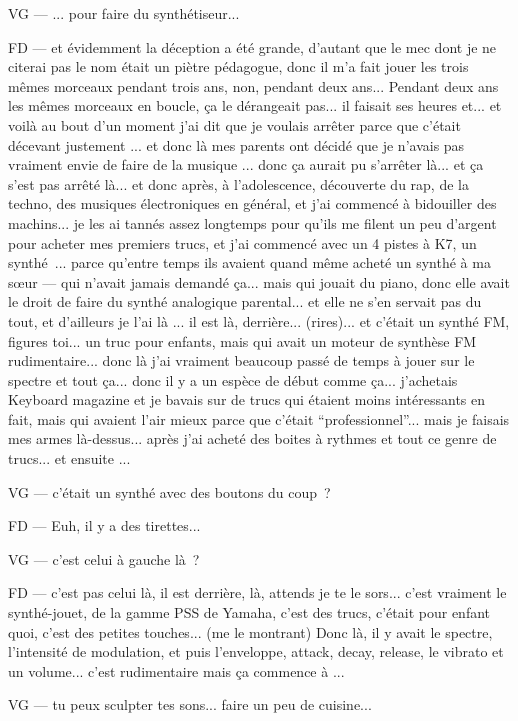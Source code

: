 VG — ... pour faire du synthétiseur... 

FD — et évidemment la déception a été grande, d'autant que le mec dont je ne citerai pas le nom était un piètre pédagogue, donc il m'a fait jouer les trois mêmes morceaux pendant trois ans, non, pendant deux ans... Pendant deux ans les mêmes morceaux en boucle, ça le dérangeait pas... il faisait ses heures et... et voilà au bout d'un moment j'ai dit que je voulais arrêter parce que c'était décevant justement ... et donc là mes parents ont décidé que je n'avais pas vraiment envie de faire de la musique ... donc ça aurait pu s'arrêter là... et ça s'est pas arrêté là... et donc après, à l'adolescence, découverte du rap, de la techno, des musiques électroniques en général, et j'ai commencé à bidouiller des machins... je les ai tannés assez longtemps pour qu'ils me filent un peu d'argent pour acheter mes premiers trucs, et j'ai commencé avec un 4 pistes à K7, un synthé ... parce qu'entre temps ils avaient quand même acheté un synthé à ma sœur — qui n'avait jamais demandé ça... mais qui jouait du piano, donc elle avait le droit de faire du synthé analogique parental... et elle ne s'en servait pas du tout, et d'ailleurs je l'ai là ... il est là, derrière... (rires)... et c'était un synthé FM, figures toi... un truc pour enfants, mais qui avait un moteur de synthèse FM rudimentaire... donc là j'ai vraiment beaucoup passé de temps à jouer sur le spectre et tout ça... donc il y a un espèce de début comme ça... j'achetais Keyboard magazine et je bavais sur de trucs qui étaient moins intéressants en fait, mais qui avaient l'air mieux parce que c'était ``professionnel''... mais je faisais mes armes là-dessus... après j'ai acheté des boites à rythmes et tout ce genre de trucs... et ensuite ... 

VG — c'était un synthé avec des boutons du coup ? 

FD — Euh, il y a des tirettes... 

VG — c'est celui à gauche là ? 

FD — c'est pas celui là, il est derrière, là, attends je te le sors... c'est vraiment le synthé-jouet, de la gamme PSS de Yamaha, c'est des trucs, c'était pour enfant quoi, c'est des petites touches... (me le montrant) Donc là, il y avait le spectre, l'intensité de modulation, et puis l'enveloppe, attack, decay, release, le vibrato et un volume... c'est rudimentaire mais ça commence à ... 

VG — tu peux sculpter tes sons... faire un peu de cuisine... 


